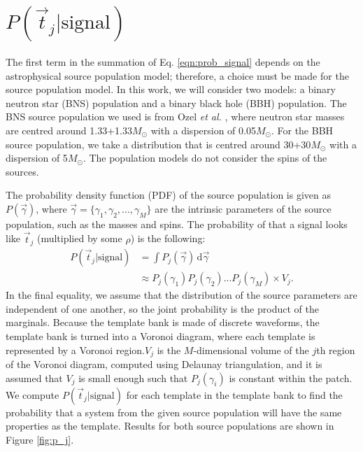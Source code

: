 \documentclass[twocolumn,showpacs,unsortedaddress,superscriptaddress,showkeys,nofootinbib,preprintnumbers,letterpaper]{revtex4-1}
\newcommand*{\diff}{\,\mathrm{d}}
\begin{document}

\section{$P(\vec{t}_j|\text{signal})$} \label{sec:P_j}

The first term in the summation of Eq. \ref{eqn:prob_signal} depends on the astrophysical source population model; therefore, a choice must be made for the source population model. In this work, we will consider two models: a binary neutron star (BNS) population and a binary black hole (BBH) population. The BNS source population we used is from Ozel {\it et al.} \cite{Ozel:2012ax}, where neutron star masses are centred around 1.33+1.33$M_\odot$ with a dispersion of 0.05$M_\odot$. For the BBH source population, we take a distribution that is centred around 30+30$M_{\odot}$ with a dispersion of 5$M_\odot$. The population models do not consider the spins of the sources.

The probability density function (PDF) of the source population is given as $P(\vec{\gamma})$, where $\vec{\gamma}=\{\gamma_1,\gamma_2,..., \gamma_M\}$ are the intrinsic parameters of the source population, such as the masses and spins. The probability of that a signal looks like $\vec{t}_j$ (multiplied by some $\rho$) is the following:
	\begin{align}
	P(\vec{t}_j|\text{signal}) &= \int P_j(\vec{\gamma}) \diff\vec{\gamma} \\
	&\approx P_j(\gamma_1) P_j(\gamma_2)...P_j(\gamma_M) \times V_j.
	\end{align}
In the final equality, we assume that the distribution of the source parameters are independent of one another, so the joint probability is the product of the marginals. Because the template bank is made of discrete waveforms, the template bank is turned into a Voronoi diagram, where each template is represented by a Voronoi region.$V_j$ is the $M$-dimensional volume of the $j$th region of the Voronoi diagram, computed using Delaunay triangulation, and it is assumed that $V_j$ is small enough such that $P_j(\gamma_i)$ is constant within the patch. We compute $P(\vec{t}_j|\text{signal})$ for each template in the template bank to find the probability that a system from the given source population will have the same properties as the template. Results for both source populations are shown in Figure \ref{fig:p_j}.
\end{document}
